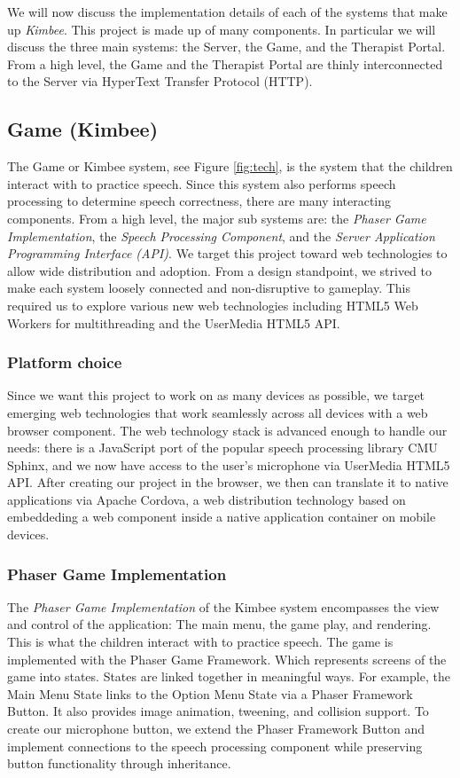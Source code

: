 \documentclass{sig-alternate-2013}
\begin{document}
We will now discuss the implementation details of each of the systems that make up {\em Kimbee}. This project is made up of many components. In particular we will discuss the three main systems: the Server, the Game, and the Therapist Portal. From a high level, the Game and the Therapist Portal are thinly interconnected to the Server via HyperText Transfer Protocol (HTTP).

\subsection{Game ({\secit Kimbee})}
The Game or Kimbee system, see Figure \ref{fig:tech}, is the system that the children interact with to practice speech. Since this system also performs speech processing to determine speech correctness, there are many interacting components. From a high level, the major sub systems are: the {\em Phaser Game Implementation}, the {\em Speech Processing Component}, and the {\em Server Application Programming Interface (API)}. We target this project toward web technologies to allow wide distribution and adoption. From a design standpoint, we strived to make each system loosely connected and non-disruptive to gameplay. This required us to explore various new web technologies including HTML5 Web Workers for multithreading and the UserMedia HTML5 API.

\subsubsection{Platform choice}
Since we want this project to work on as many devices as possible, we target emerging web technologies that work seamlessly across all devices with a web browser component. The web technology stack is advanced enough to handle our needs: there is a JavaScript port of the popular speech processing library CMU Sphinx, and we now have access to the user's microphone via UserMedia HTML5 API. After creating our project in the browser, we then can translate it to native applications via Apache Cordova, a web distribution technology based on embeddeding a web component inside a native application container on mobile devices.

\subsubsection{Phaser Game Implementation}
The {\em Phaser Game Implementation} of the Kimbee system encompasses the view and control of the application: The main menu, the game play, and rendering. This is what the children interact with to practice speech. The game is implemented with the Phaser Game Framework. Which represents screens of the game into states. States are linked together in meaningful ways. For example, the Main Menu State links to the Option Menu State via a Phaser Framework Button. It also provides image animation, tweening, and collision support. To create our microphone button, we extend the Phaser Framework Button and implement connections to the speech processing component while preserving button functionality through inheritance.
\end{document}
